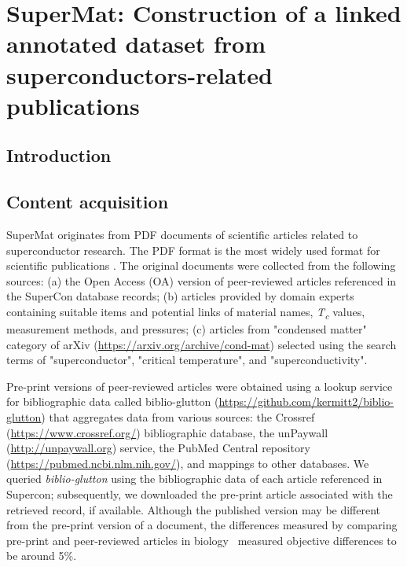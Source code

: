 
\chapter{SuperMat: Construction of a linked annotated dataset from superconductors-related publications}

\section{Introduction}

\label{content-acquisition}
\section{Content acquisition}
SuperMat originates from PDF documents of scientific articles related to superconductor research. 
The PDF format is the most widely used format for scientific publications \cite{johnson2018pdfStatistics}.
The original documents were collected from the following sources: (a) the Open Access (OA) version of peer-reviewed articles referenced in the SuperCon database records; 
(b) articles provided by domain experts containing suitable items and potential links of material names, \textit{T\textsubscript{c}} values, measurement methods, and pressures; (c) articles from "condensed matter" category of arXiv (\url{https://arxiv.org/archive/cond-mat}) selected using the search terms of "superconductor", "critical temperature", and "superconductivity". 

Pre-print versions of peer-reviewed articles were obtained using a lookup service for bibliographic data called biblio-glutton (\url{https://github.com/kermitt2/biblio-glutton}) that aggregates data from various sources: the Crossref (\url{https://www.crossref.org/}) bibliographic database, the unPaywall (\url{http://unpaywall.org}) service, the PubMed Central repository (\url{https://pubmed.ncbi.nlm.nih.gov/}), and mappings to other databases. 
We queried \textit{biblio-glutton} using the bibliographic data of each article referenced in Supercon; subsequently, we downloaded the pre-print article associated with the retrieved record, if available. 
Although the published version may be different from the pre-print version of a document, the differences measured by comparing pre-print and peer-reviewed articles in biology~\cite{carneiro_comparing_2020} measured objective differences to be around 5\%.


